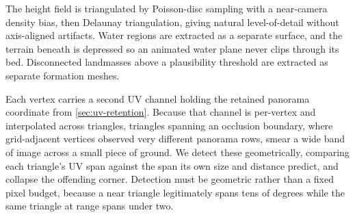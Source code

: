 The height field is triangulated by Poisson-disc sampling with a near-camera
density bias, then Delaunay triangulation, giving natural level-of-detail without
axis-aligned artifacts. Water regions are extracted as a separate surface, and the
terrain beneath is depressed so an animated water plane never clips through its
bed. Disconnected landmasses above a plausibility threshold are extracted as
separate formation meshes.

Each vertex carries a second UV channel holding the retained panorama coordinate
from \cref{sec:uv-retention}. Because that channel is per-vertex and interpolated
across triangles, triangles spanning an occlusion boundary, where grid-adjacent
vertices observed very different panorama rows, smear a wide band of image
across a small piece of ground. We detect these geometrically, comparing each
triangle's UV span against the span its own size and distance predict, and collapse
the offending corner. Detection must be geometric rather than a fixed pixel budget,
because a near triangle legitimately spans tens of degrees while the same triangle
at range spans under two.
